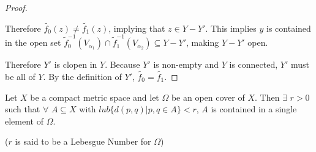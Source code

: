 \begin{proof}
\begin{itemize}
		Therefore $\widetilde{f_0}(z)\ne\widetilde{f_1}(z)$, implying that $z\in Y-Y'$. This implies $y$ is contained in the open set $\widetilde{f}_0^{-1}(V_{\alpha_1})\cap\widetilde{f}_1^{-1}(V_{\alpha_2})\subseteq Y-Y'$, making $Y-Y'$ open. 
	\end{itemize}
	Therefore $Y'$ is clopen in $Y$. Because $Y'$ is non-empty and $Y$ is connected, $Y'$ must be all of $Y$. By the definition of $Y'$, $\widetilde{f_0}=\widetilde{f_1}$. 
\end{proof}
\begin{lemma}
	 Let $X$ be a compact metric space and let $\Omega$ be an open cover of $X$. Then $\exists$ $r > 0$ such that $\forall$ $A \subseteq X$ with $lub \{ d(p,q)|p, q \in A \} < r$, $A$ is contained in a single element of $\Omega$.
	
	($r$ is said to be a Lebesgue Number for $\Omega$) 
\end{lemma}

